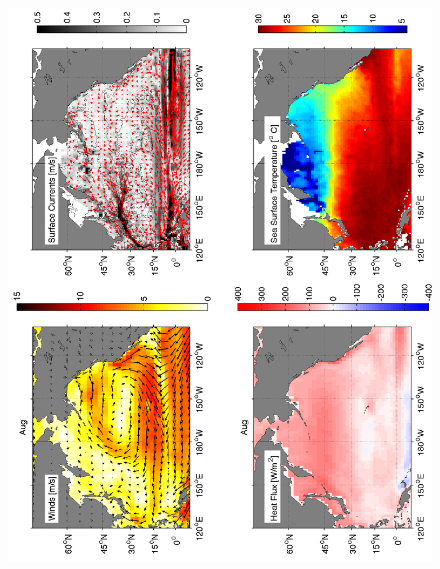 \begin{figure}[hbt]
  \begin{center}
  \includegraphics[angle=270]{figs/WindOverview/SurfaceCurrents08}
    \caption{}
    \label{fig:}  
  \end{center}
\end{figure}

